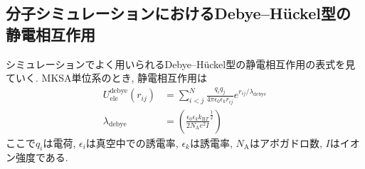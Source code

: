 \subsection{分子シミュレーションにおけるDebye--H\"{u}ckel型の静電相互作用}
シミュレーションでよく用いられるDebye--H\"{u}ckel型の静電相互作用の表式を見ていく.
MKSA単位系のとき, 静電相互作用は
\begin{align}
    U_{\mathrm{ele}}^{\mathrm{debye}} (r_{ij})
    &=
    \sum_{i<j}^{N}
    \frac{q_{i}q_{j}}{4\pi\epsilon_{0}\epsilon_{k}r_{ij}} e^{r_{ij}/\lambda_{\mathrm{debye}}}
    \\
    \lambda_{\mathrm{debye}}
    &=
    \left(
        \frac{\epsilon_{0}\epsilon_{k}k_{\mathrm{B}T}}{2N_{\mathrm{A}}e^{2}I}^{\frac{1}{2}}
    \right)
\end{align}
ここで$q_{i}$は電荷, $\epsilon_{i}$は真空中での誘電率, $\epsilon_{k}$は誘電率, $N_{\mathrm{A}}$はアボガドロ数, $I$はイオン強度である.




% 
% 

